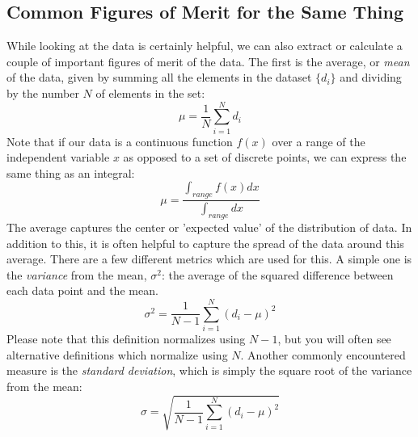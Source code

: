 \subsection{Common Figures of Merit for the Same Thing }
While looking at the data is certainly helpful, we can also extract or calculate a couple of important figures of merit of the data.  The first is the average, or \textit{mean} of the data, given by summing all the elements in the dataset $\{d_i\}$ and dividing by the number $N$ of elements in the set:
\begin{equation}
\mu  =  \frac{1}{N}\sum_{i=1}^N d_i
\end{equation}
Note that if our data is a continuous function $f(x)$ over a range of the independent variable $x$ as opposed to a set of discrete points, we can express the same thing as an integral:
\begin{equation}
\mu = \frac{\int_{range} f(x) dx}{\int_{range} dx}
\end{equation}
The average captures the center or 'expected value' of the distribution of data.  In addition to this, it is often helpful to capture the spread of the data around this average.  There are a few different metrics which are used for this.  A simple one is the \textit{variance} from the mean, $\sigma^2$:  the average of the squared difference between each data point and the mean.
 \begin{equation}
\sigma^2  =  \frac{1}{N-1}\sum_{i=1}^N (d_i - \mu)^2
\end{equation}
Please note that this definition normalizes using $N-1$, but you will often see alternative definitions which normalize using $N$. Another commonly encountered measure is the \textit{standard deviation}, which is simply the square root of the variance from the mean:
 \begin{equation}
\sigma  =  \sqrt{\frac{1}{N-1}\sum_{i=1}^N (d_i - \mu)^2}
\end{equation}

